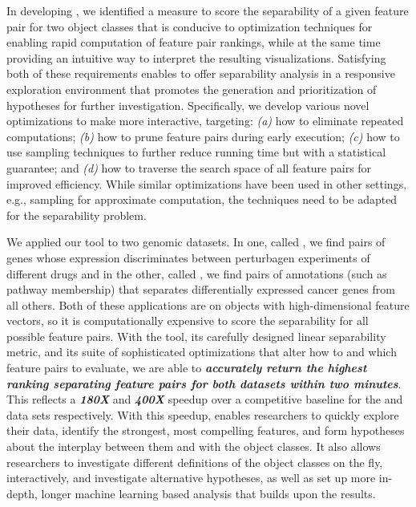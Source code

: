 In developing \genviz, 
we identified a measure to score the separability 
of a given feature pair for two object classes
that is conducive to 
optimization techniques for enabling rapid 
computation of feature pair rankings, while at
the same time providing an intuitive way to interpret
the resulting visualizations.
Satisfying both of these requirements enables \genviz to offer separability analysis in a responsive exploration environment that promotes the generation and prioritization of hypotheses for further investigation. Specifically, we develop various novel optimizations to make \genviz more interactive, targeting: {\em (a)} how to eliminate repeated computations; {\em (b)} how to prune feature pairs during early execution; {\em (c)} how to use sampling techniques to further reduce running time but with a statistical guarantee; and {\em (d)} how to traverse the search space of all feature pairs for improved efficiency. 
While similar optimizations have been used in other settings,
e.g., sampling for approximate computation\needcite{},
the techniques need to be adapted for the separability problem.

We applied our \genviz tool to two genomic datasets.
In one, called \lincs, we find pairs of genes
whose expression discriminates between perturbagen experiments 
of different drugs and in the other, called \msig, 
we find pairs of annotations (such as pathway membership) 
that separates differentially expressed cancer genes from all others. 
Both of these applications are on objects with high-dimensional feature vectors, 
so it is computationally expensive to score the separability 
for all possible feature pairs. 
With the \genviz tool, its carefully designed linear separability metric, 
and its suite of sophisticated optimizations that alter how to and which feature pairs to evaluate, 
we are able to {\bf \em accurately return the highest ranking separating 
feature pairs for both datasets   within two minutes}. 
This reflects a {\bf \em 180X} and {\bf \em 400X} speedup 
over a competitive baseline for the \msig and \lincs data sets respectively. 
With this speedup, \genviz enables researchers to quickly explore their data,
identify the strongest, most compelling features, 
and form hypotheses about the interplay between them and with the object classes. 
It also allows researchers to investigate different definitions 
of the object classes on the fly, interactively, 
and investigate alternative hypotheses, 
as well as set up more in-depth, 
longer machine learning based analysis that builds upon the \genviz results. 

